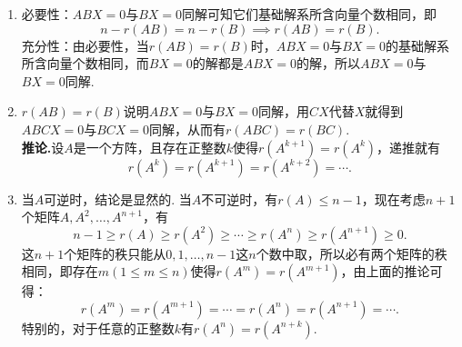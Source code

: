 \documentclass[12pt,fontset=fandol]{ctexart}
\begin{document}
\begin{solve}
\begin{enumerate}
                \item 必要性：$ABX=0$与$BX=0$同解可知它们基础解系所含向量个数相同，即
                      \[ n-r(AB)=n-r(B)\implies r(AB)=r(B). \]
                      充分性：由必要性，当$r(AB)=r(B)$时，$ABX=0$与$BX=0$的基础解系所含向量个数相同，而$BX=0$的解都是$ABX=0$的解，所以$ABX=0$与$BX=0$同解.

                \item $r(AB)=r(B)$说明$ABX=0$与$BX=0$同解，用$CX$代替$X$就得到$ABCX=0$与$BCX=0$同解，从而有$r(ABC)=r(BC)$.\\
                      \textbf{推论.}设$A$是一个方阵，且存在正整数$k$使得$r(A^{k+1})=r(A^k)$，递推就有
                      \[ r(A^k)=r(A^{k+1})=r(A^{k+2})=\cdots. \]

                \item 当$A$可逆时，结论是显然的. 当$A$不可逆时，有$r(A)\leqslant n-1$，现在考虑$n+1$个矩阵$A,A^2,\ldots,A^{n+1}$，有
                      \[ n-1\geqslant r(A)\geqslant r(A^2)\geqslant\cdots\geqslant r(A^n)\geqslant r(A^{n+1})\geqslant 0. \]
                      这$n+1$个矩阵的秩只能从$0,1,\ldots,n-1$这$n$个数中取，所以必有两个矩阵的秩相同，即存在$m(1\leqslant m\leqslant n)$使得$r(A^m)=r(A^{m+1})$，由上面的推论可得：
                      \[ r(A^m)=r(A^{m+1})=\cdots=r(A^{n})=r(A^{n+1})=\cdots. \]
                      特别的，对于任意的正整数$k$有$r(A^n)=r(A^{n+k})$.
            \end{enumerate}
\end{solve}
\end{document}
